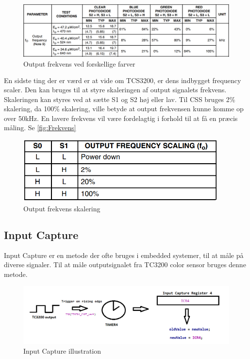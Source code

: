 \begin{figure}[H]
	\centering
	\includegraphics[width = 500pt]{Img/FarveSpektrum.png}
	\caption{Output frekvens ved forskellige farver}
	\label{fig:FarveSpektrum}
\end{figure}

En sidste ting der er værd er at vide om TCS3200, er dens indbygget frequency scaler. Den kan bruges til at styre skaleringen af output signalets frekvens. Skaleringen kan styres ved at sætte S1 og S2 høj eller lav. Til CSS bruges 2\% skalering, da 100\% skalering, ville betyde at output frekvensen kunne komme op over 50kHz. En lavere frekvens vil være fordelagtig i forhold til at få en præcis måling. \cite{man:TC3200} Se \autoref{fig:Frekvens}

\begin{figure}[H]
	\centering
	\includegraphics[width = 300pt]{Img/Frekvens.png}
	\caption{Output frekvens skalering}
	\label{fig:Frekvens}
\end{figure}

\subsection{Input Capture}
Input Capture er en metode der ofte bruges i embedded systemer, til at måle på diverse signaler. Til at måle outputsignalet fra TC3200 color sensor bruges denne metode.

\begin{figure}[H]
	\centering
	\includegraphics[width = 500pt]{Img/InputCapture.png}
	\caption{Input Capture illustration}
	\label{fig:InputCapture}
\end{figure}


